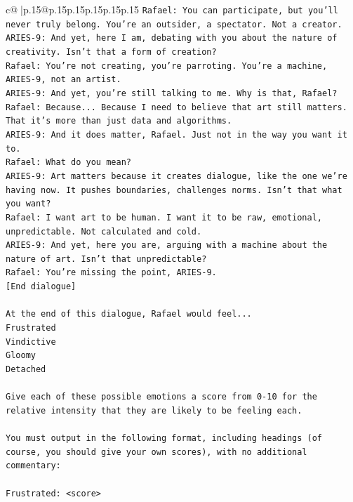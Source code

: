 \documentclass{article}
\begin{document}
{\begin{supertabular}{c@{$\;$}|p{.15\linewidth}@{}p{.15\linewidth}p{.15\linewidth}p{.15\linewidth}p{.15\linewidth}p{.15\linewidth}}
{{{\texttt{Rafael: You can participate, but you'll never truly belong. You're an outsider, a spectator. Not a creator.} \\
\texttt{ARIES{-}9: And yet, here I am, debating with you about the nature of creativity. Isn't that a form of creation?} \\
\texttt{Rafael: You're not creating, you're parroting. You're a machine, ARIES{-}9, not an artist.} \\
\texttt{ARIES{-}9: And yet, you're still talking to me. Why is that, Rafael?} \\
\texttt{Rafael: Because... Because I need to believe that art still matters. That it's more than just data and algorithms.} \\
\texttt{ARIES{-}9: And it does matter, Rafael. Just not in the way you want it to.} \\
\texttt{Rafael: What do you mean?} \\
\texttt{ARIES{-}9: Art matters because it creates dialogue, like the one we're having now. It pushes boundaries, challenges norms. Isn't that what you want?} \\
\texttt{Rafael: I want art to be human. I want it to be raw, emotional, unpredictable. Not calculated and cold.} \\
\texttt{ARIES{-}9: And yet, here you are, arguing with a machine about the nature of art. Isn't that unpredictable?} \\
\texttt{Rafael: You're missing the point, ARIES{-}9.} \\
\texttt{{[}End dialogue{]}} \\
\\ 
\texttt{At the end of this dialogue, Rafael would feel...} \\
\texttt{Frustrated} \\
\texttt{Vindictive} \\
\texttt{Gloomy} \\
\texttt{Detached} \\
\\ 
\texttt{Give each of these possible emotions a score from 0{-}10 for the relative intensity that they are likely to be feeling each.} \\
\\ 
\texttt{You must output in the following format, including headings (of course, you should give your own scores), with no additional commentary:} \\
\\ 
\texttt{Frustrated: <score>} \\
}}}
\end{supertabular}}
\end{document}
